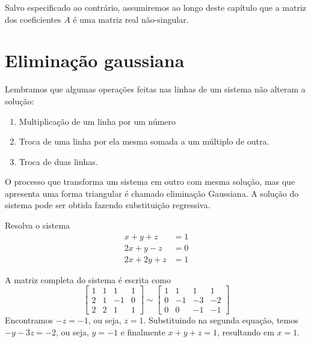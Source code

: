 Salvo especificado ao contrário, assumiremos ao longo deste capítulo que a matriz dos coeficientes $A$ é uma matriz real não-singular.




\section{Eliminação gaussiana}
Lembramos que algumas operações feitas nas linhas de um sistema não alteram a solução:
\begin{enumerate}
\item Multiplicação de um linha por um número
\item Troca de uma linha por ela mesma somada a um múltiplo de outra.
\item Troca de duas linhas.
\end{enumerate}

O processo que transforma um sistema em outro com mesma solução, mas que apresenta uma forma triangular é chamado eliminação Gaussiana. A solução do sistema pode ser obtida fazendo substituição regressiva.
\begin{ex} Resolva o sistema
  \begin{align}
    x+y+z  &=1\\
    2x+y-z &=0\\
    2x+2y+z&=1
  \end{align}
\end{ex}
\begin{sol}
A matriz completa do sistema é escrita como
\begin{equation*}
  \left[\begin{array}{ccc|c}
      1 &1& 1&1\\
      2 &1& -1&0\\
      2 & 2 &1&1
    \end{array}\right] \sim 
  \left[\begin{array}{ccc|c}
      1 &1& 1&1\\
      0 &-1& -3&-2\\
      0 & 0 &-1&-1
    \end{array}\right]
\end{equation*}
Encontramos $-z=-1$, ou seja, $z=1$. Substituindo na segunda equação, temos $-y-3z=-2$, ou seja, $y=-1$ e finalmente $x+y+z=1$, resultando em $x=1$.
\end{sol}

